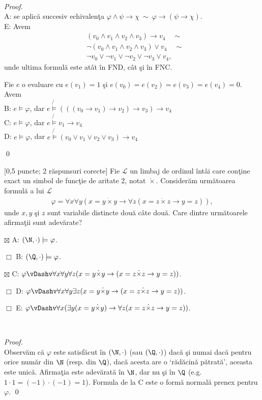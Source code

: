 \documentclass[12pt]{article}
\newcommand{\probex}{\stepcounter{uebno}{\vspace{0.3cm}\noindent \bf (P\arabic{uebno}) }}
\newcommand{\solutiong}[1]{$\,$ \\ \begin{proof}\mbox{}\\#1 \qed \end{proof}}
\begin{document}
\solutiong{
    A: se aplic\u{a} succesiv echivalen\c{t}a $\varphi \wedge \psi \to \chi \ \sim \ \varphi \to (\psi \to \chi)$. \\ 
    E: Avem 
    \begin{align*}
        &(v_0 \wedge v_1 \wedge v_2 \wedge v_3) \to v_4 \quad\sim\\ 
        &\neg(v_0 \wedge v_1 \wedge v_2 \wedge v_3) \vee v_4 \quad\sim \\ 
        &\neg v_0 \vee \neg v_1 \vee \neg v_2 \vee \neg v_3 \vee v_4,
    \end{align*}
    unde ultima formul\u{a} este at\^{a}t \^{i}n FND, c\^{a}t \c{s}i \^{i}n FNC.

    Fie $e$ o evaluare cu $e(v_1) = 1$ \c{s}i $e(v_0) = e(v_2) = e(v_3) = e(v_4) = 0$.
    Avem \\ 
    B: $e \models \varphi$, dar $e \not{\models} (((v_0 \to v_1) \to v_2) \to v_3) \to v_4$ \\ 
    C: $e \models \varphi$, dar $e \not{\models} v_1 \to v_4$ \\
    D: $e \models \varphi$, dar $e \not{\models} (v_0 \vee v_1 \vee v_2 \vee v_3) \to v_4$
    
}

\probex 
[0,5 puncte; 2 r\u{a}spunsuri corecte]
Fie $\mathcal{L}$ un limbaj de ordinul \^{i}nt\^{a}i care con\c{t}ine exact un simbol de func\c{t}ie de aritate 2,
notat $\dot{\times}$. 
Consider\u{a}m urm\u{a}toarea formul\u{a} a lui $\mathcal{L}$
\begin{align*}
\varphi = \forall x \forall y (x = y \dot{\times} y \to \forall z (x = z \dot{\times} z \to y = z)),
\end{align*} 
unde $x, y$ \c{s}i $z$ sunt variabile distincte dou\u{a} c\^{a}te dou\u{a}.
Care dintre urm\u{a}toarele afirma\c{t}ii sunt adev\u{a}rate? 

$\boxtimes$ A: $(\N, \cdot) \models \varphi$. 

$\Box$ B: $(\Q, \cdot) \models \varphi$.

$\boxtimes$ C: $\varphi \vDashv \forall x \forall y \forall z (x = y \dot{\times} y \to (x = z \dot{\times} z \to y = z))$.

$\Box$ D: $\varphi \vDashv \forall x \forall y \exists z (x = y \dot{\times} y \to (x = z \dot{\times} z \to y = z))$.

$\Box$ E: $\varphi \vDashv \forall x (\exists y (x = y \dot{\times} y) \to \forall z (x = z \dot{\times} z \to y = z))$.

\solutiong{
    Observ\u{a}m c\u{a} $\varphi$ este satisf\u{a}cut \^{i}n 
    $(\N, \cdot)$ (sau $(\Q, \cdot)$) dac\u{a} \c{s}i numai dac\u{a} 
    pentru orice num\u{a}r din $\N$ (resp. din $\Q$), dac\u{a} acesta are o 
    `r\u{a}d\u{a}cin\u{a} p\u{a}trat\u{a}', aceasta este unic\u{a}.  
    Afirma\c{t}ia este adev\u{a}rat\u{a} \^{i}n $\N$, dar nu \c{s}i \^{i}n 
    $\Q$ (e.g. $1 \cdot 1 = (-1) \cdot (-1) = 1$).
    Formula de la C este o form\u{a} normal\u{a} prenex pentru $\varphi$.
}
\end{document}
